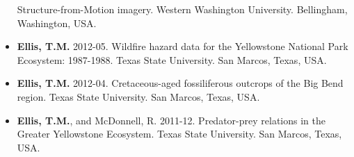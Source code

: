 \documentclass[11pt,a4paper,]{awesome-cv}
\begin{document}
\begin{itemize}
  Structure-from-Motion imagery. Western Washington University.
  Bellingham, Washington, USA.
\item
  \textbf{Ellis, T.M.} 2012-05. Wildfire hazard data for the Yellowstone
  National Park Ecosystem: 1987-1988. Texas State University. San
  Marcos, Texas, USA.
\item
  \textbf{Ellis, T.M.} 2012-04. Cretaceous-aged fossiliferous outcrops
  of the Big Bend region. Texas State University. San Marcos, Texas,
  USA.
\item
  \textbf{Ellis, T.M.}, and McDonnell, R. 2011-12. Predator-prey
  relations in the Greater Yellowstone Ecosystem. Texas State
  University. San Marcos, Texas, USA.
\end{itemize}


\label{LastPage}~
\end{document}
